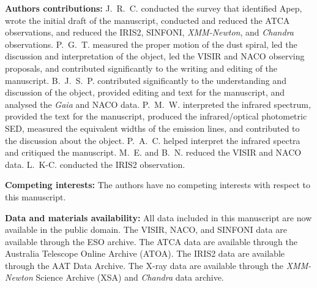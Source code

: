 \documentclass[preprint,times]{aastex61}
\begin{document}
\textbf{Authors contributions:} J.~R.~C. conducted the survey that identified Apep, wrote the initial draft of the manuscript, conducted and reduced the ATCA observations, and reduced the IRIS2, SINFONI, \emph{XMM-Newton}, and \emph{Chandra} observations. P.~G.~T. measured the proper motion of the dust spiral, led the discussion and interpretation of the object, led the VISIR and NACO observing proposals, and contributed significantly to the writing and editing of the manuscript. B.~J.~S.~P. contributed significantly to the understanding and discussion of the object, provided editing and text for the manuscript, and analysed the \emph{Gaia} and NACO data. P.~M.~W. interpreted the infrared spectrum, provided the text for the manuscript, produced the infrared/optical photometric SED, measured the equivalent widths of the emission lines, and contributed to the discussion about the object. P.~A.~C. helped interpret the infrared spectra and critiqued the manuscript. M.~E. and B.~N. reduced the VISIR and NACO data. L.~K-C. conducted the IRIS2 observation.

\textbf{Competing interests:} The authors have no competing interests with respect to this manuscript.

\textbf{Data and materials availability:} All data included in this manuscript are now available in the public domain. The VISIR, NACO, and SINFONI data are available through the ESO archive. The ATCA data are available through the Australia Telescope Online Archive (ATOA). The IRIS2 data are available through the AAT Data Archive. The X-ray data are available through the \emph{XMM-Newton} Science Archive (XSA) and \emph{Chandra} data archive. 

\newpage

\end{document}
